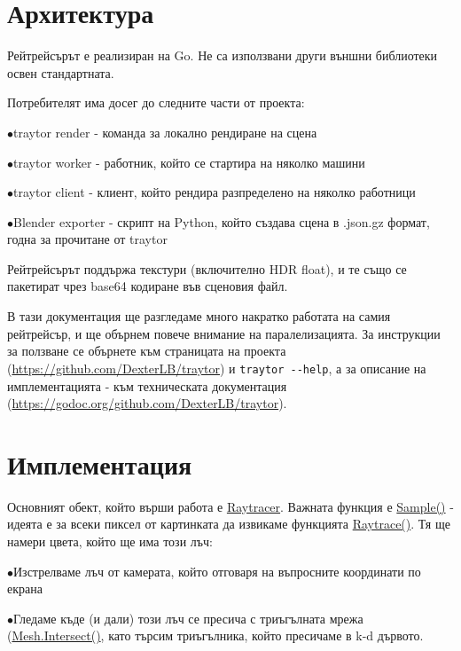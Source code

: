 \documentclass[12pt]{extarticle}
\newlength{\bulletwidth}\settowidth{\bulletwidth}{$\bullet$}
\newcommand{\mitem}{\vspace{5mm}\setlength{\leftskip}{\leftmargin}\hspace*{-\labelsep}\hspace*{-\bulletwidth}$\bullet$\hspace*{\labelsep}}
\newcommand{\mend}{\setlength{\leftskip}{0cm}\vspace{5mm}}
\begin{document}
\pagebreak
\section{Архитектура}

Рейтрейсърът е реализиран на Go. Не са използвани други външни
библиотеки освен стандартната.

Потребителят има досег до следните части от проекта:

\mitem traytor render - команда за локално рендиране на сцена

\mitem traytor worker - работник, който се стартира на няколко машини

\mitem traytor client - клиент, който рендира разпределено на няколко
работници

\mitem Blender exporter - скрипт на Python, който създава сцена в
.json.gz формат, годна за прочитане от traytor

\mend

Рейтрейсърът поддържа текстури (включително HDR float), и те също
се пакетират чрез base64 кодиране във сценовия файл.

В тази документация ще разгледаме много накратко работата на самия
рейтрейсър, и ще обърнем повече внимание на паралелизацията. За
инструкции за ползване се обърнете към страницата на проекта 
(\url{https://github.com/DexterLB/traytor})
и \verb|traytor --help|, а за описание на имплементацията - към
техническата документация
(\url{https://godoc.org/github.com/DexterLB/traytor}).

\section{Имплементация}
Основният обект, който върши работа е \href{https://godoc.org/github.com/DexterLB/traytor/raytracer#Raytracer}{Raytracer}. Важната функция е \href{https://godoc.org/github.com/DexterLB/traytor/raytracer#Raytracer.Sample}{Sample()} - идеята е за всеки пиксел
от картинката да извикаме функцията \href{https://godoc.org/github.com/DexterLB/traytor/raytracer#Raytracer.Raytrace}{Raytrace()}.
Тя ще намери цвета, който ще има този лъч:


	\mitem Изстрелваме лъч от камерата, който отговаря на въпросните
	координати по екрана
	
	\mitem Гледаме къде (и дали) този лъч се пресича с триъгълната
	мрежа (\href{https://godoc.org/github.com/DexterLB/traytor/mesh#Mesh.Intersect}{Mesh.Intersect()}, като търсим триъгълника,
	който пресичаме в k-d дървото.
	
\end{document}
